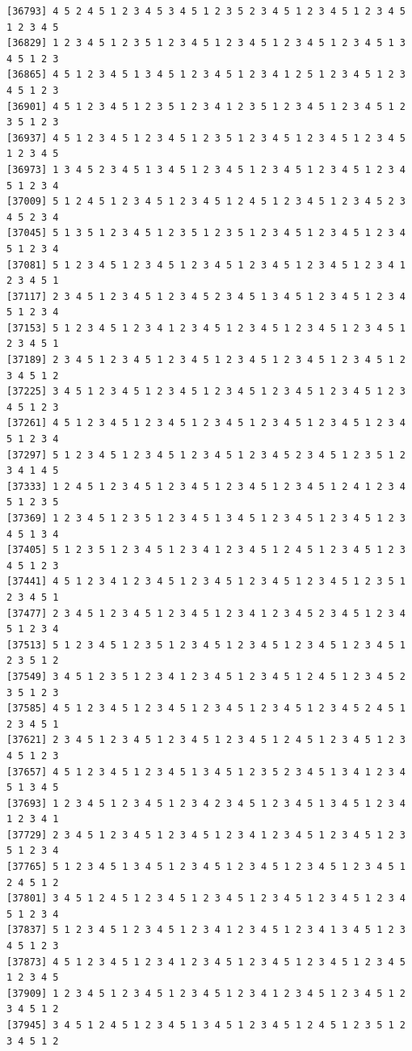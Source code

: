 \documentclass[
  english,
]{book}
\begin{document}
\begin{verbatim}
[36793] 4 5 2 4 5 1 2 3 4 5 3 4 5 1 2 3 5 2 3 4 5 1 2 3 4 5 1 2 3 4 5 1 2 3 4 5
[36829] 1 2 3 4 5 1 2 3 5 1 2 3 4 5 1 2 3 4 5 1 2 3 4 5 1 2 3 4 5 1 3 4 5 1 2 3
[36865] 4 5 1 2 3 4 5 1 3 4 5 1 2 3 4 5 1 2 3 4 1 2 5 1 2 3 4 5 1 2 3 4 5 1 2 3
[36901] 4 5 1 2 3 4 5 1 2 3 5 1 2 3 4 1 2 3 5 1 2 3 4 5 1 2 3 4 5 1 2 3 5 1 2 3
[36937] 4 5 1 2 3 4 5 1 2 3 4 5 1 2 3 5 1 2 3 4 5 1 2 3 4 5 1 2 3 4 5 1 2 3 4 5
[36973] 1 3 4 5 2 3 4 5 1 3 4 5 1 2 3 4 5 1 2 3 4 5 1 2 3 4 5 1 2 3 4 5 1 2 3 4
[37009] 5 1 2 4 5 1 2 3 4 5 1 2 3 4 5 1 2 4 5 1 2 3 4 5 1 2 3 4 5 2 3 4 5 2 3 4
[37045] 5 1 3 5 1 2 3 4 5 1 2 3 5 1 2 3 5 1 2 3 4 5 1 2 3 4 5 1 2 3 4 5 1 2 3 4
[37081] 5 1 2 3 4 5 1 2 3 4 5 1 2 3 4 5 1 2 3 4 5 1 2 3 4 5 1 2 3 4 1 2 3 4 5 1
[37117] 2 3 4 5 1 2 3 4 5 1 2 3 4 5 2 3 4 5 1 3 4 5 1 2 3 4 5 1 2 3 4 5 1 2 3 4
[37153] 5 1 2 3 4 5 1 2 3 4 1 2 3 4 5 1 2 3 4 5 1 2 3 4 5 1 2 3 4 5 1 2 3 4 5 1
[37189] 2 3 4 5 1 2 3 4 5 1 2 3 4 5 1 2 3 4 5 1 2 3 4 5 1 2 3 4 5 1 2 3 4 5 1 2
[37225] 3 4 5 1 2 3 4 5 1 2 3 4 5 1 2 3 4 5 1 2 3 4 5 1 2 3 4 5 1 2 3 4 5 1 2 3
[37261] 4 5 1 2 3 4 5 1 2 3 4 5 1 2 3 4 5 1 2 3 4 5 1 2 3 4 5 1 2 3 4 5 1 2 3 4
[37297] 5 1 2 3 4 5 1 2 3 4 5 1 2 3 4 5 1 2 3 4 5 2 3 4 5 1 2 3 5 1 2 3 4 1 4 5
[37333] 1 2 4 5 1 2 3 4 5 1 2 3 4 5 1 2 3 4 5 1 2 3 4 5 1 2 4 1 2 3 4 5 1 2 3 5
[37369] 1 2 3 4 5 1 2 3 5 1 2 3 4 5 1 3 4 5 1 2 3 4 5 1 2 3 4 5 1 2 3 4 5 1 3 4
[37405] 5 1 2 3 5 1 2 3 4 5 1 2 3 4 1 2 3 4 5 1 2 4 5 1 2 3 4 5 1 2 3 4 5 1 2 3
[37441] 4 5 1 2 3 4 1 2 3 4 5 1 2 3 4 5 1 2 3 4 5 1 2 3 4 5 1 2 3 5 1 2 3 4 5 1
[37477] 2 3 4 5 1 2 3 4 5 1 2 3 4 5 1 2 3 4 1 2 3 4 5 2 3 4 5 1 2 3 4 5 1 2 3 4
[37513] 5 1 2 3 4 5 1 2 3 5 1 2 3 4 5 1 2 3 4 5 1 2 3 4 5 1 2 3 4 5 1 2 3 5 1 2
[37549] 3 4 5 1 2 3 5 1 2 3 4 1 2 3 4 5 1 2 3 4 5 1 2 4 5 1 2 3 4 5 2 3 5 1 2 3
[37585] 4 5 1 2 3 4 5 1 2 3 4 5 1 2 3 4 5 1 2 3 4 5 1 2 3 4 5 2 4 5 1 2 3 4 5 1
[37621] 2 3 4 5 1 2 3 4 5 1 2 3 4 5 1 2 3 4 5 1 2 4 5 1 2 3 4 5 1 2 3 4 5 1 2 3
[37657] 4 5 1 2 3 4 5 1 2 3 4 5 1 3 4 5 1 2 3 5 2 3 4 5 1 3 4 1 2 3 4 5 1 3 4 5
[37693] 1 2 3 4 5 1 2 3 4 5 1 2 3 4 2 3 4 5 1 2 3 4 5 1 3 4 5 1 2 3 4 1 2 3 4 1
[37729] 2 3 4 5 1 2 3 4 5 1 2 3 4 5 1 2 3 4 1 2 3 4 5 1 2 3 4 5 1 2 3 5 1 2 3 4
[37765] 5 1 2 3 4 5 1 3 4 5 1 2 3 4 5 1 2 3 4 5 1 2 3 4 5 1 2 3 4 5 1 2 4 5 1 2
[37801] 3 4 5 1 2 4 5 1 2 3 4 5 1 2 3 4 5 1 2 3 4 5 1 2 3 4 5 1 2 3 4 5 1 2 3 4
[37837] 5 1 2 3 4 5 1 2 3 4 5 1 2 3 4 1 2 3 4 5 1 2 3 4 1 3 4 5 1 2 3 4 5 1 2 3
[37873] 4 5 1 2 3 4 5 1 2 3 4 1 2 3 4 5 1 2 3 4 5 1 2 3 4 5 1 2 3 4 5 1 2 3 4 5
[37909] 1 2 3 4 5 1 2 3 4 5 1 2 3 4 5 1 2 3 4 1 2 3 4 5 1 2 3 4 5 1 2 3 4 5 1 2
[37945] 3 4 5 1 2 4 5 1 2 3 4 5 1 3 4 5 1 2 3 4 5 1 2 4 5 1 2 3 5 1 2 3 4 5 1 2

\end{verbatim}
\end{document}
